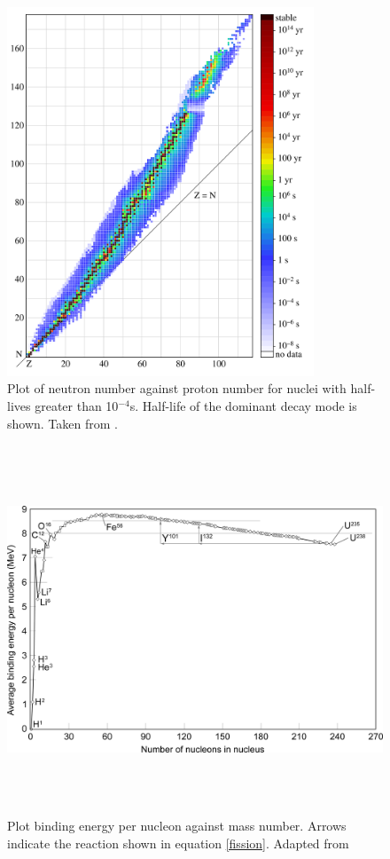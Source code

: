 \begin{figure}[htp]
\centering
\includegraphics[height=11cm]{images/Isotopes_and_half-life.png}
\caption{Plot of neutron number against proton number for nuclei with half-lives greater than 10${^{-4}}$s. Half-life of the dominant decay mode is shown. Taken from \cite{BenRGPlotIsotopes}.}
\label{figure:NZcurve}
\end{figure}

\begin{figure}[htp]
\centering
\includegraphics[height=11cm]{images/Binding_energy_curve.png}
\caption{Plot binding energy per nucleon against mass number. Arrows indicate the reaction shown in equation \ref{fission}. Adapted from \cite{FastfissionBindingCurve}}
\label{figure:bindingenergy}
\end{figure}


